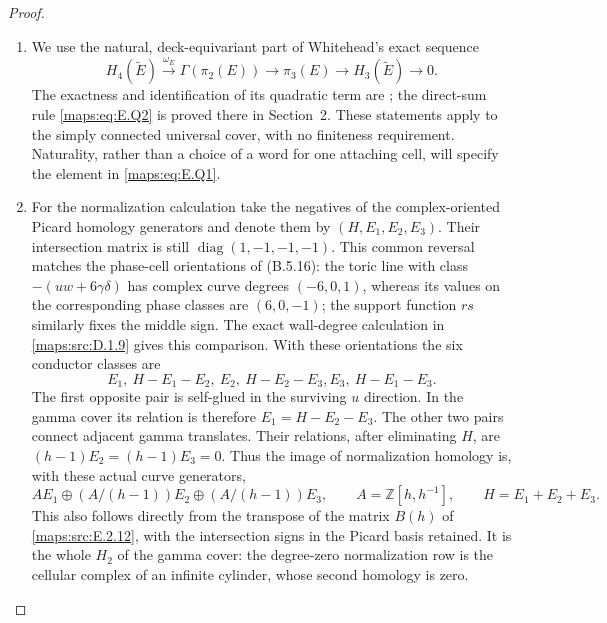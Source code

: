 \begin{proof}
\begin{enumerate}[label=\arabic*.,leftmargin=*]
\item We use the natural, deck-equivariant part of Whitehead's exact
sequence
\[
 H_4(\widetilde E)\xrightarrow{\omega_E}\Gamma(\pi_2(E))
       \longrightarrow\pi_3(E)\longrightarrow
 H_3(\widetilde E)\longrightarrow0.
 \tag{E.Q3}\label{maps:eq:E.Q3}
\]
The exactness and identification of its quadratic term are
\cite[Theorems 1 and 5]{mapsWhitehead50}; the direct-sum rule
\eqref{maps:eq:E.Q2} is proved there in Section~2.  These statements apply
to the simply connected universal cover, with no finiteness
requirement.  Naturality, rather than a choice of a word for
one attaching cell, will specify the element in \eqref{maps:eq:E.Q1}.

\item For the normalization calculation take the negatives of
the complex-oriented Picard homology generators and denote
them by $(H,E_1,E_2,E_3)$.  Their intersection matrix is
still $\operatorname{diag}(1,-1,-1,-1)$.  This common reversal
matches the phase-cell orientations of (B.5.16): the toric
line with class $-(uw+6\gamma\delta)$ has complex curve
degrees $(-6,0,1)$, whereas its values on the corresponding
phase classes are $(6,0,-1)$; the support function $rs$
similarly fixes the middle sign.  The exact wall-degree
calculation in \ref{maps:src:D.1.9} gives this comparison.  With these
orientations the six conductor classes are
\[
 E_1,\ H-E_1-E_2,\ E_2,\ H-E_2-E_3,
                                      E_3,\ H-E_1-E_3.
\]
The first opposite pair is self-glued in the surviving $u$
direction.  In the gamma cover its relation is therefore
$E_1=H-E_2-E_3$.  The other two pairs connect adjacent gamma
translates.  Their relations, after eliminating $H$, are
$(h-1)E_2=(h-1)E_3=0$.  Thus the image of normalization
homology is, with these actual curve generators,
\[
 A E_1\oplus(A/(h-1))E_2\oplus(A/(h-1))E_3,
 \qquad A=\mathbb Z[h,h^{-1}],\qquad H=E_1+E_2+E_3.
 \tag{E.Q4}\label{maps:eq:E.Q4}
\]
This also follows directly from the transpose of the matrix
$B(h)$ of \ref{maps:src:E.2.12}, with the intersection signs in the Picard
basis retained.  It is the whole $H_2$ of the gamma cover:
the degree-zero normalization row is the cellular complex
of an infinite cylinder, whose second homology is zero.


\end{enumerate}
\end{proof}
